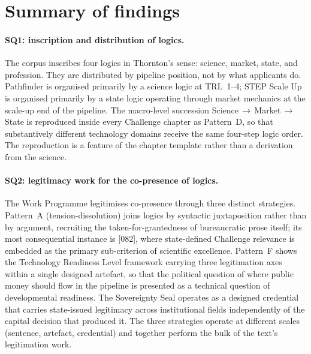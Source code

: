 \section{Summary of findings}
\label{sec:conc-findings}

\paragraph{SQ1: inscription and distribution of logics.}
The corpus inscribes four logics in Thornton's sense: science, market,
state, and profession. They are distributed by pipeline position, not
by what applicants do. Pathfinder is organised primarily by a science
logic at TRL~1--4; STEP Scale Up is organised primarily by a state
logic operating through market mechanics at the scale-up end of the
pipeline. The macro-level succession Science\,$\to$\,Market\,$\to$
\,State is reproduced inside every Challenge chapter as Pattern~D, so
that substantively different technology domains receive the same
four-step logic order. The reproduction is a feature of the chapter
template rather than a derivation from the science.

\paragraph{SQ2: legitimacy work for the co-presence of logics.}
The Work Programme legitimises co-presence through three distinct
strategies. Pattern~A (tension-dissolution) joins logics by syntactic
juxtaposition rather than by argument, recruiting the
taken-for-grantedness of bureaucratic prose itself; its most
consequential instance is [082], where state-defined Challenge
relevance is embedded as the primary sub-criterion of scientific
excellence. Pattern~F shows the Technology Readiness Level framework
carrying three legitimation axes within a single designed artefact,
so that the political question of where public money should flow in
the pipeline is presented as a technical question of developmental
readiness. The Sovereignty Seal operates as a designed credential
that carries state-issued legitimacy across institutional fields
independently of the capital decision that produced it. The three
strategies operate at different scales (sentence, artefact,
credential) and together perform the bulk of the text's legitimation
work.

